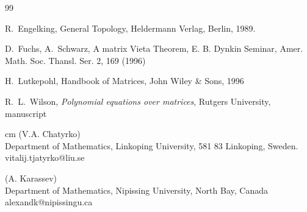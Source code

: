 \documentclass[12pt]{amsart}
\theoremstyle{plain}
\theoremstyle{definition}
\begin{document}
\begin{thebibliography}{99}

 R.~Engelking, General Topology, Heldermann Verlag, Berlin, 1989.

 D.~Fuchs, A.~Schwarz,  A matrix Vieta Theorem, E. B. Dynkin Seminar, Amer. Math. Soc. Thansl. Ser. 2, 169 (1996)

 H.~Lutkepohl, Handbook of Matrices, John Wiley \& Sons, 1996

 R.~L.~Wilson, {\em Polynomial equations over matrices}, Rutgers University, manuscript

\end{thebibliography}

 cm
\noindent(V.A. Chatyrko)\\
Department of Mathematics, Linkoping University, 581 83 Linkoping, Sweden.\\
vitalij.tjatyrko@liu.se

\vskip0.3cm
\noindent(A. Karassev) \\
Department of Mathematics,
Nipissing University, North Bay, Canada\\
alexandk@nipissingu.ca
\end{document}
